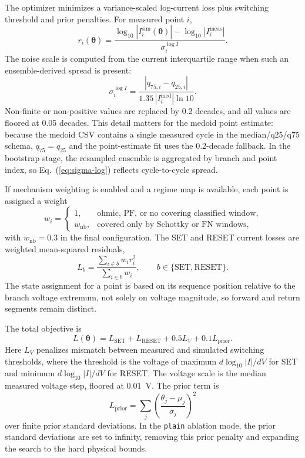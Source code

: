 \documentclass[journal]{IEEEtran}
\begin{document}
The optimizer minimizes a variance-scaled log-current loss plus switching
threshold and prior penalties.  For measured point $i$,
\begin{equation}
  r_i(\boldsymbol{\theta})
  =
  \frac{\log_{10}|I_i^{\mathrm{sim}}(\boldsymbol{\theta})|
  -\log_{10}|I_i^{\mathrm{meas}}|}
  {\sigma_i^{\log I}}.
  \label{eq:residual}
\end{equation}
The noise scale is computed from the current interquartile range when such an
ensemble-derived spread is present:
\begin{equation}
  \sigma_i^{\log I}
  =
  \frac{|q_{75,i}-q_{25,i}|}{1.35\,|I_i^{\mathrm{med}}|\ln 10}.
  \label{eq:sigma-log}
\end{equation}
Non-finite or non-positive values are replaced by 0.2 decades, and all values
are floored at 0.05 decades.  This detail matters for the medoid point
estimate: because the medoid CSV contains a single measured cycle in the
median/q25/q75 schema, $q_{75}=q_{25}$ and the point-estimate fit uses the
0.2-decade fallback.  In the bootstrap stage, the resampled ensemble is
aggregated by branch and point index, so Eq.~(\ref{eq:sigma-log}) reflects
cycle-to-cycle spread.

If mechanism weighting is enabled and a regime map is available, each point is
assigned a weight
\begin{equation}
  w_i =
  \begin{cases}
    1, & \text{ohmic, PF, or no covering classified window},\\
    w_{\mathrm{nb}}, & \text{covered only by Schottky or FN windows},
  \end{cases}
  \label{eq:weights}
\end{equation}
with $w_{\mathrm{nb}}=0.3$ in the final configuration.  The SET and RESET
current losses are weighted mean-squared residuals,
\begin{equation}
  L_b =
  \frac{\sum_{i\in b} w_i r_i^2}{\sum_{i\in b}w_i},
  \qquad b\in\{\mathrm{SET},\mathrm{RESET}\}.
  \label{eq:branch-loss}
\end{equation}
The state assignment for a point is based on its sequence position relative to
the branch voltage extremum, not solely on voltage magnitude, so forward and
return segments remain distinct.

The total objective is
\begin{equation}
  L(\boldsymbol{\theta})
  =
  L_{\mathrm{SET}}+L_{\mathrm{RESET}}
  +0.5L_V+0.1L_{\mathrm{prior}}.
  \label{eq:loss}
\end{equation}
Here $L_V$ penalizes mismatch between measured and simulated switching
thresholds, where the threshold is the voltage of maximum
$d\log_{10}|I|/dV$ for SET and minimum $d\log_{10}|I|/dV$ for RESET.  The
voltage scale is the median measured voltage step, floored at
\SI{0.01}{\volt}.  The prior term is
\[
  L_{\mathrm{prior}}
  =
  \sum_j
  \left(\frac{\theta_j-\mu_j}{\sigma_j}\right)^2
\]
over finite prior standard deviations.  In the \texttt{plain} ablation mode,
the prior standard deviations are set to infinity, removing this prior
penalty and expanding the search to the hard physical bounds.
\end{document}
